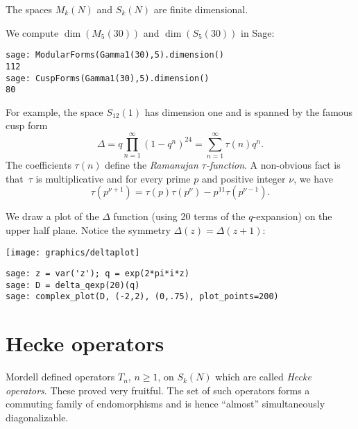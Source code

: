 \documentclass{report}
\begin{document}
The spaces $M_k(N)$ and $S_k(N)$
are finite dimensional.
\begin{example}
We compute $\dim(M_5(30))$ and $\dim(S_5(30))$ in Sage:
\begin{lstlisting}
sage: ModularForms(Gamma1(30),5).dimension()
112
sage: CuspForms(Gamma1(30),5).dimension()
80
\end{lstlisting}
\end{example}


For example,
the space $S_{12}(1)$ has dimension one and
is spanned by the famous cusp form
\begin{equation*}
\Delta = q\prod_{n=1}^{\infty}(1-q^n)^{24} = \sum_{n=1}^{\infty} \tau(n) q^n.
\end{equation*}
The coefficients $\tau(n)$ define the
{\em Ramanujan $\tau$-function}.
A non-obvious fact is that~$\tau$ is multiplicative and for
every prime $p$ and positive integer $\nu$, we have
$$
\tau(p^{\nu+1})=\tau(p)\tau(p^{\nu})-p^{11}\tau(p^{\nu-1}).
$$

\begin{example}
We draw a plot of the $\Delta$ function (using 20 terms of the $q$-expansion) on the upper half plane.  Notice the symmetry $\Delta(z)=\Delta(z+1)$:
\begin{center}
\texttt{[image: graphics/deltaplot]}
\end{center}
\begin{lstlisting}
sage: z = var('z'); q = exp(2*pi*i*z)
sage: D = delta_qexp(20)(q)
sage: complex_plot(D, (-2,2), (0,.75), plot_points=200)
\end{lstlisting}
\end{example}

\section{Hecke operators}\label{sec:hecke1}
Mordell defined
operators $T_n$, $n\geq 1$, on $S_k(N)$ which are called
{\em Hecke operators}.
These proved very fruitful. The set of such
operators forms a commuting family of endomorphisms and
is hence ``almost'' simultaneously diagonalizable.
\end{document}
